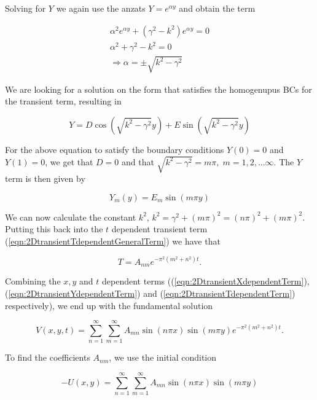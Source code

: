 \documentclass{article}
\begin{document}
Solving for $Y$ we again use the anzats $Y=e^{\alpha y}$ and obtain the term

\begin{subequations}
	\begin{eqnarray}
	\alpha^2 e^{\alpha y} + (\gamma^2 - k^2)e^{\alpha y} = 0 \\
	\alpha^2 + \gamma^2 - k^2 = 0 \\
	\Rightarrow \alpha = \pm \sqrt{k^2 - \gamma^2} 
	\end{eqnarray}
\end{subequations}

We are looking for a solution on the form that satisfies the homogenupus BCs for the transient term, resulting in

\begin{equation}
Y = D\cos(\sqrt{k^2 - \gamma^2}y) + E\sin(\sqrt{k^2 - \gamma^2}y)
\end{equation}

For the above equation to satisfy the boundary conditions $Y(0) = 0$ and $Y(1) = 0$, we get that $D = 0$ and that $\sqrt{k^2 - \gamma^2} = m\pi,\; m = 1,2,...\infty$. The $Y$ term is then given by

\begin{equation}
Y_m(y) = E_m\sin(m\pi y)
\label{eqn:2DtransientYdependentTerm}
\end{equation}

We can now calculate the constant $k^2$,  $k^2 = \gamma^2 + (m\pi)^2 = (n\pi)^2 + (m\pi)^2$. Putting this back into the $t$ dependent transient term (\ref{eqn:2DtransientTdependentGeneralTerm}) we have that 

\begin{equation}
T = A_{nm}e^{-\pi^2(m^2+n^2)t}.
\label{eqn:2DtransientTdependentTerm}
\end{equation}

Combining the $x,y$ and $t$ dependent terms ((\ref{eqn:2DtransientXdependentTerm}), (\ref{eqn:2DtransientYdependentTerm}) and (\ref{eqn:2DtransientTdependentTerm}) respectively), we end up with the fundamental solution

\begin{equation}
V(x,y,t) = \sum_{n=1}^{\infty} \sum_{m=1}^{\infty} A_{mn}\sin(n\pi x)\sin(m\pi y)e^{-\pi^2(m^2+n^2)t}.
\end{equation}

To find the coefficients $A_{nm}$, we use the initial condition

\begin{equation}
-U(x,y) =  \sum_{n=1}^{\infty} \sum_{m=1}^{\infty} A_{mn}\sin(n\pi x)\sin(m\pi y)
\end{equation}
\end{document}
